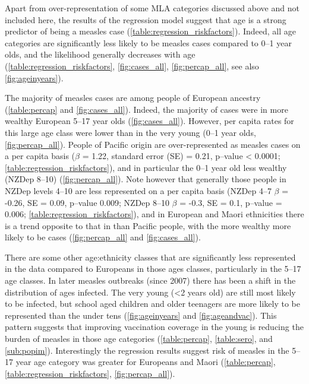 \documentclass{article}
\begin{document}
Apart from over-representation of some MLA categories discussed above and not included here, the results of the regression model suggest that age is a strong predictor of being a measles case (\autoref{table:regression_riskfactors}). Indeed, all age categories are significantly less likely to be measles cases compared to 0--1 year olds, and the likelihood generally decreases with age (\autoref{table:regression_riskfactors}, \autoref{fig:cases_all}, \autoref{fig:percap_all}, see also \autoref{fig:ageinyears}).

The majority of measles cases are among people of European ancestry (\autoref{table:percap} and \autoref{fig:cases_all}). Indeed, the majority of cases were in more wealthy European 5--17 year olds (\autoref{fig:cases_all}). However, per capita rates for this large age class were lower than in the very young (0--1 year olds, \autoref{fig:percap_all}). People of Pacific origin are over-represented as measles cases on a per capita basis ($\beta$ = 1.22, standard error (SE) = 0.21, p--value < 0.0001; \autoref{table:regression_riskfactors}), and in particular the 0--1 year old less wealthy (NZDep 8--10) (\autoref{fig:percap_all}). Note however that generally those people in NZDep levels 4--10 are less represented on a per capita basis (NZDep 4--7 $\beta$ = -0.26, SE = 0.09, p--value 0.009; NZDep 8--10 $\beta$ = -0.3, SE = 0.1, p--value = 0.006; \autoref{table:regression_riskfactors}), and in European and Maori ethnicities there is a trend opposite to that in than Pacific people, with the more wealthy more likely to be cases (\autoref{fig:percap_all} and \autoref{fig:cases_all}).

There are some other age:ethnicity classes that are significantly less represented in the data compared to Europeans in those ages classes, particularly in the 5--17 age classes. In later measles outbreaks (since 2007) there has been a shift in the distribution of ages infected. The very young (<2 years old) are still most likely to be infected, but school aged children and older teenagers are more likely to be represented than the under tens (\autoref{fig:ageinyears} and \autoref{fig:ageandvac}). This pattern suggests that improving vaccination coverage in the young is reducing the burden of measles in those age categories (\autoref{table:percap}, \autoref{table:sero}, and \autoref{sub:popim}). Interestingly the regression results suggest risk of measles in the 5--17 year age category was greater for Europeans and Maori (\autoref{table:percap}, \autoref{table:regression_riskfactors}, \autoref{fig:percap_all}).
\end{document}
